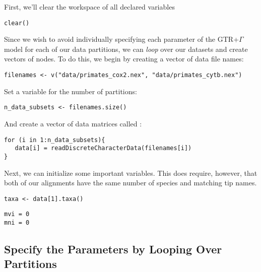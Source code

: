 First, we'll clear the workspace of all declared variables
{\tt \begin{snugshade*}
\begin{lstlisting}
clear()
\end{lstlisting}
\end{snugshade*}}

Since we wish to avoid individually specifying each parameter of the GTR+$\Gamma$ model for each of our data partitions, we can \textit{loop} over our datasets and create vectors of nodes.
To do this, we begin by creating a vector of data file names:
{\tt \begin{snugshade*}
\begin{lstlisting}
filenames <- v("data/primates_cox2.nex", "data/primates_cytb.nex")
\end{lstlisting}
\end{snugshade*}}

Set a variable for the number of partitions:
{\tt \begin{snugshade*}
\begin{lstlisting}
n_data_subsets <- filenames.size()
\end{lstlisting}
\end{snugshade*}}

And create a vector of data matrices called :
{\tt \begin{snugshade*}
\begin{lstlisting}
for (i in 1:n_data_subsets){
   data[i] = readDiscreteCharacterData(filenames[i])
}
\end{lstlisting}
\end{snugshade*}}

Next, we can initialize some important variables. This does require, however, that both of our alignments have the same number of species and matching tip names.
{\tt \begin{snugshade*}
\begin{lstlisting}
taxa <- data[1].taxa()
\end{lstlisting}
\end{snugshade*}}

{\tt \begin{snugshade*}
\begin{lstlisting}
mvi = 0 
mni = 0
\end{lstlisting}
\end{snugshade*}}


\subsection{Specify the Parameters by Looping Over Partitions}

